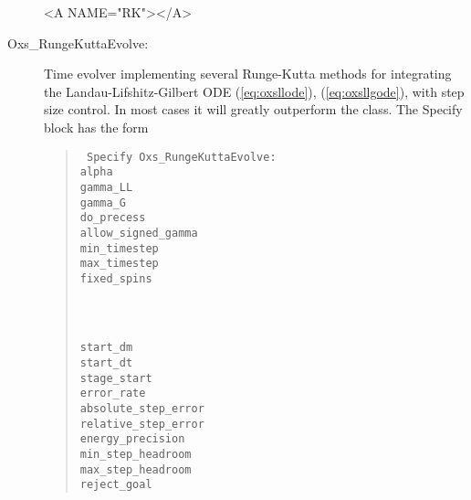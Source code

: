 \begin{description}
\begin{rawhtml}<A NAME="RK"></A>\end{rawhtml}%
%
\item[Oxs\_RungeKuttaEvolve:\label{html:RungeKuttaEvolve}]
Time evolver implementing several Runge-Kutta methods for integrating
the Landau-Lifshitz-Gilbert ODE
(\ref{eq:oxsllode}), (\ref{eq:oxsllgode}), with step size control.  In
most cases it will greatly outperform the  class.
The Specify block has the form
   \begin{latexonly}
   \begin{quote}\tt
   Specify Oxs\_RungeKuttaEvolve: \ocb\\
    \bi alpha                  \oxsval{$\alpha$}\\
    \bi gamma\_LL              \oxsval{$\bar{\gamma}$}\\
    \bi gamma\_G               \oxsval{$\gamma$}\\
    \bi do\_precess            \\
    \bi allow\_signed\_gamma \\
    \bi min\_timestep          \\
    \bi max\_timestep          \\
    \bi fixed\_spins \ocb\\
    \bi\bi {}\\
    \bi\bi  {}\\
    \bi\ccb\\
    \bi start\_dm              \oxsval{$\Delta \vm$}\\
    \bi start\_dt              \\
    \bi stage\_start           \\
    \bi error\_rate            \\
    \bi absolute\_step\_error  \\
    \bi relative\_step\_error  \\
    \bi energy\_precision      \\
    \bi min\_step\_headroom    \\
    \bi max\_step\_headroom    \\
    \bi reject\_goal           \\

\end{quote}
\end{latexonly}
\end{description}
